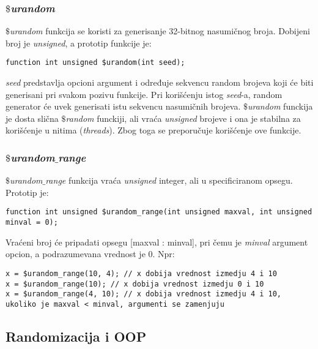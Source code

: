 \subsubsection{\emph{\(\$\)urandom}}

\emph{\(\$\)urandom} funkcija se koristi za generisanje 32-bitnog nasumičnog broja. Dobijeni broj je \emph{unsigned}, a prototip funkcije je:

\begin{lstlisting}
function int unsigned $urandom(int seed);
\end{lstlisting}

\emph{seed} predstavlja opcioni argument i određuje sekvencu random brojeva
koji će biti generisani pri svakom pozivu funkcije. Pri korišćenju istog
\emph{seed}-a, random generator će uvek generisati istu sekvencu nasumičnih
brojeva. \emph{\(\$\)urandom} funckija je dosta slična \emph{\(\$\)random}
funckiji, ali vraća \emph{unsigned} brojeve i ona je stabilna za korišćenje u
nitima (\emph{threads}). Zbog toga se preporučuje korišćenje ove funkcije.

\subsubsection{\emph{\(\$\)urandom\(\_\)range}}

\emph{\(\$\)urandom\(\_\)range} funkcija vraća \emph{unsigned} integer, ali u
specificiranom opsegu. Prototip je:

\begin{lstlisting}
function int unsigned $urandom_range(int unsigned maxval, int unsigned minval = 0);
\end{lstlisting}

Vraćeni broj će pripadati opsegu [maxval : minval], pri čemu je \emph{minval}
argument opcion, a podrazumevana vrednost je 0. Npr:

\begin{lstlisting}
x = $urandom_range(10, 4); // x dobija vrednost izmedju 4 i 10
x = $urandom_range(10); // x dobija vrednost izmedju 0 i 10
x = $urandom_range(4, 10); // x dobija vrednost izmedju 4 i 10, ukoliko je maxval < minval, argumenti se zamenjuju
\end{lstlisting}


\subsection{Randomizacija i OOP}

